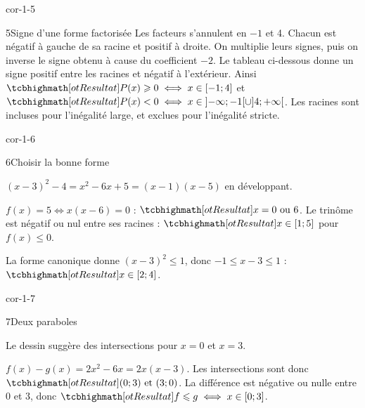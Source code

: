 \begin{blocLivre}{cor-1-5}
\begin{corrige}{5}{Signe d'une forme factorisée}
Les facteurs s’annulent en $-1$ et 4. Chacun est négatif à gauche de sa racine et positif à droite.
On multiplie leurs signes, puis on inverse le signe obtenu à cause du coefficient $-2$.
Le tableau ci-dessous donne un signe positif entre les racines et négatif à l’extérieur.
Ainsi $\res{P(x)\geq0\iff x\in[-1;4]}$ et
$\res{P(x)<0\iff x\in\mathopen{]}-\infty;-1[\cup]4;+\infty[}$.
Les racines sont incluses pour l’inégalité large, et exclues pour l’inégalité stricte.

\label{figlivre-r01-05-signes-cor}

\end{corrige}
\end{blocLivre}
\begin{blocLivre}{cor-1-6}
\begin{corrige}{6}{Choisir la bonne forme}
\begin{questions}
\item $(x-3)^2-4=x^2-6x+5=(x-1)(x-5)$ en développant.
\item $f(x)=5\iff x(x-6)=0$ : $\res{x=0\text{ ou }6}$.
Le trinôme est négatif ou nul entre ses racines : $\res{x\in[1;5]}$ pour $f(x)\leq0$.
\item La forme canonique donne $(x-3)^2\leq1$, donc $-1\leq x-3\leq1$ :
$\res{x\in[2;4]}$.
\end{questions}
\end{corrige}
\end{blocLivre}
\begin{blocLivre}{cor-1-7}
\begin{corrige}{7}{Deux paraboles}
\begin{questions}
\item Le dessin suggère des intersections pour $x=0$ et $x=3$.
\item $f(x)-g(x)=2x^2-6x=2x(x-3)$.
Les intersections sont donc $\res{(0;3)\text{ et }(3;0)}$.
La différence est négative ou nulle entre 0 et 3, donc $\res{f\leq g\iff x\in[0;3]}$.
\end{questions}
\end{corrige}
\end{blocLivre}
